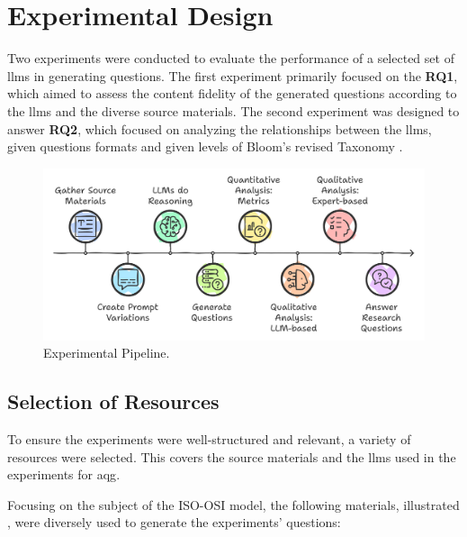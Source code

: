 \section{Experimental Design}
\label{sec:experiment-design}

Two experiments were conducted to evaluate the performance of a selected set of \ac{llms} in generating questions. The first experiment primarily focused on the \textbf{RQ1}, which aimed to assess the content fidelity of the generated questions according to the \ac{llms} and the diverse source materials. The second experiment was designed to answer \textbf{RQ2}, which focused on analyzing the relationships between the \ac{llms}, given questions formats and given levels of Bloom's revised Taxonomy \cite{krathwohl_revision_2002}.

\begin{figure}[htbp]
    \centering
    \includegraphics[width=\textwidth]{../extra/approach.png}
    \caption[Experimental Pipeline.]{Experimental Pipeline\footnotemark.}
    \label{fig:experiment-overview}
\end{figure}
\vspace{-1em}
    
\subsection{Selection of Resources}
\label{sec:selection-resources}

To ensure the experiments were well-structured and relevant, a variety of resources were selected. This covers the source materials and the \ac{llms} used in the experiments for \ac{aqg}.

Focusing on the subject of the ISO-OSI model, the following materials, illustrated , were diversely used to generate the experiments' questions:

